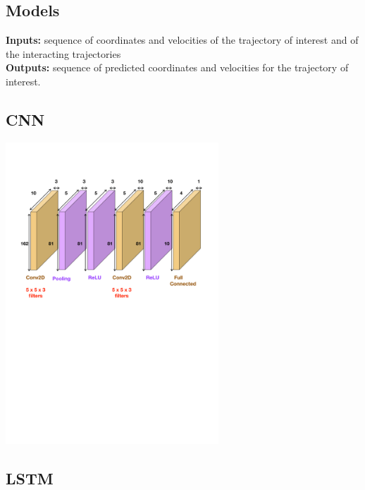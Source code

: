 \documentclass[a0,portrait]{a0poster}
\begin{document}
\begin{multicols}{2}

\section*{Models}
\textbf{Inputs:} sequence of coordinates and velocities of the trajectory of interest and of the interacting trajectories\\
\textbf{Outputs:} sequence of predicted coordinates and velocities for the trajectory of interest.\\

\begin{minipage}[]{0.5\linewidth}
\subsection*{CNN}
\centerline {\includegraphics[width=0.6\textwidth]{figure/CNN}}
\vspace{3cm}
\end{minipage}
\hfill
\begin{minipage}[]{0.5\linewidth}
\subsection*{LSTM}


\end{minipage}
\end{multicols}
\end{document}
